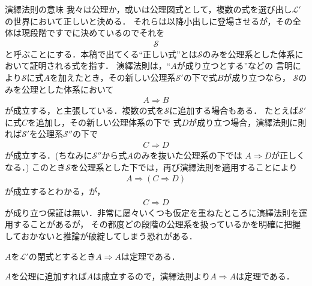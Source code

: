 	\begin{itembox}[l]{演繹法則の意味}
		我々は公理か，或いは公理図式として，複数の式を選び出し$\mathcal{L}'$の世界において正しいと決める．
		それらは以降小出しに登場させるが，その全体は現段階ですでに決めているのでそれを
		\begin{align}
			\mathscr{S}
		\end{align}
		と呼ぶことにする．本稿で出てくる``正しい式''とは$\mathscr{S}$のみを公理系とした体系において証明される式を指す．
		演繹法則は，``$A$が成り立つとする''などの
		言明により$\mathscr{S}$に式$A$を加えたとき，その新しい公理系$\mathscr{S}'$の下で式$B$が成り立つなら，
		$\mathscr{S}$のみを公理とした体系において
		\begin{align}
			A \Longrightarrow B
		\end{align}
		が成立する，と主張している．複数の式を$\mathscr{S}$に追加する場合もある．
		たとえば$\mathscr{S}'$に式$C$を追加し，その新しい公理体系の下で
		式$D$が成り立つ場合，演繹法則に則れば$\mathscr{S}'$を公理系$\mathscr{S}''$の下で
		\begin{align}
			C \Longrightarrow D
		\end{align}
		が成立する．(ちなみに$\mathscr{S}''$から式$A$のみを抜いた公理系の下では
		$A \Longrightarrow D$が正しくなる．)
		このとき$\mathscr{S}$を公理系とした下では，再び演繹法則を適用することにより
		\begin{align}
			A \Longrightarrow (C \Longrightarrow D)
		\end{align}
		が成立するとわかる，が，
		\begin{align}
			C \Longrightarrow D
		\end{align}
		が成り立つ保証は無い．非常に屡々いくつも仮定を重ねたところに演繹法則を運用することがあるが，
		その都度どの段階の公理系を扱っているかを明確に把握しておかないと推論が破綻してしまう恐れがある．
	\end{itembox}
	
	\begin{screen}
		\begin{logicalthm}[含意の反射律]\label{logicalthm:reflective_law_of_implication}
			$A$を$\mathcal{L}'$の閉式とするとき$A \Longrightarrow A$は定理である．
		\end{logicalthm}
	\end{screen}
	
	\begin{prf}
		$A$を公理に追加すれば$A$は成立するので，演繹法則より$A \Longrightarrow A$は定理である．
		\QED
	\end{prf}
	
